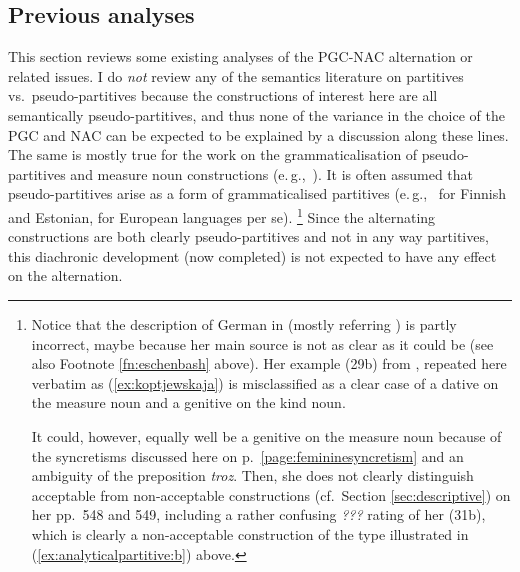 \documentclass[USenglish]{article}
\newcommand{\eg}{e.\,g.,}
\begin{document}
\subsection{Previous analyses}
\label{sec:analyses}

This section reviews some existing analyses of the PGC-NAC alternation or related issues.
I do \textit{not} review any of the semantics literature on partitives vs.\ pseudo-partitives because the constructions of interest here are all semantically pseudo-partitives, and thus none of the variance in the choice of the PGC and NAC can be expected to be explained by a discussion along these lines.
The same is mostly true for the work on the grammaticalisation of pseudo-partitives and measure noun constructions (\eg\ \citealp{Brems2003,DeclerckBrems2016,Koptjevskaja2001,Rutkowski2007}).
It is often assumed that pseudo-partitives arise as a form of grammaticalised partitives (\eg\ \citealp[536--539]{Koptjevskaja2001} for Finnish and Estonian, \citealp[559]{Koptjevskaja2001} for European languages per se).%
\footnote{Notice that the description of German in \cite[547--549]{Koptjevskaja2001} (mostly referring \citealp{Eschenbach1993}) is partly incorrect, maybe because her main source \cite{Eschenbach1993} is not as clear as it could be (see also Footnote \ref{fn:eschenbash} above).
Her example (29b) from \cite[71]{Eschenbach1993}, repeated here verbatim as (\ref{ex:koptjewskaja}) is misclassified as a clear case of a dative on the measure noun and a genitive on the kind noun.

\begin{exe}
\end{exe}

It could, however, equally well be a genitive on the measure noun because of the syncretisms discussed here on p.\ \ref{page:femininesyncretism} and an ambiguity of the preposition \textit{troz}.
Then, she does not clearly distinguish acceptable from non-acceptable constructions (cf.\ Section \ref{sec:descriptive}) on her pp.\ 548 and 549, including a rather confusing \textit{???} rating of her (31b), which is clearly a non-acceptable construction of the type illustrated in (\ref{ex:analyticalpartitive:b}) above.
}
Since the alternating constructions are both clearly pseudo-partitives and not in any way partitives, this diachronic development (now completed) is not expected to have any effect on the alternation.
\end{document}
